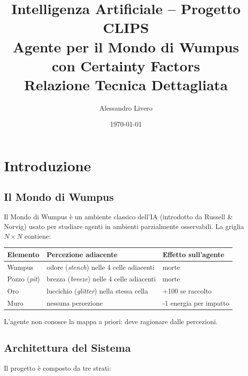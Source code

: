 \documentclass[12pt,a4paper]{article}
\title{
  \Large\textbf{Intelligenza Artificiale -- Progetto CLIPS}\\[0.5em]
  \large Agente per il Mondo di Wumpus con Certainty Factors\\[0.3em]
  \normalsize Relazione Tecnica Dettagliata
}
\author{Alessandro Livero}
\date{\today}
\begin{document}
\maketitle
\tableofcontents
\newpage

\section{Introduzione}

\subsection{Il Mondo di Wumpus}

Il Mondo di Wumpus è un ambiente classico dell'IA (introdotto da Russell \&
Norvig) usato per studiare agenti in ambienti parzialmente osservabili. La
griglia $N \times N$ contiene:

\begin{center}
\begin{tabular}{lll}
\toprule
\textbf{Elemento} & \textbf{Percezione adiacente} & \textbf{Effetto sull'agente} \\
\midrule
Wumpus & odore (\emph{stench}) nelle 4 celle adiacenti & morte \\
Pozzo (\emph{pit}) & brezza (\emph{breeze}) nelle 4 celle adiacenti & morte \\
Oro & luccichio (\emph{glitter}) nella stessa cella & +100 se raccolto \\
Muro & nessuna percezione & -1 energia per impatto \\
\bottomrule
\end{tabular}
\end{center}

L'agente non conosce la mappa a priori: deve ragionare dalle percezioni.

\subsection{Architettura del Sistema}

Il progetto è composto da tre strati:
\end{document}
